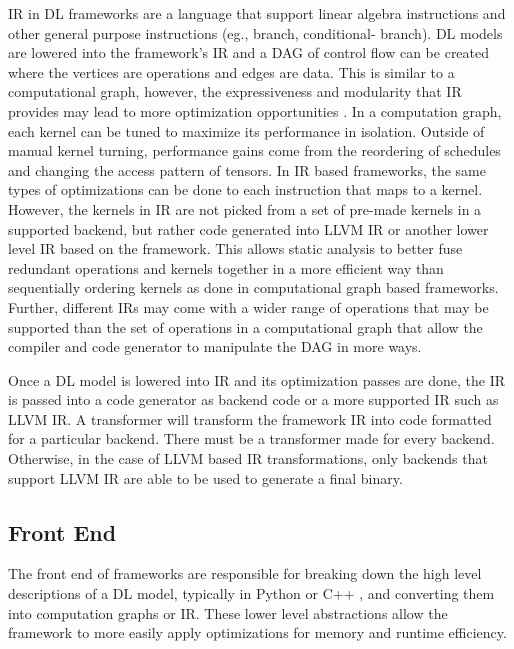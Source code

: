 IR in DL frameworks are a language that support linear algebra instructions and
other general purpose instructions (eg., branch, conditional- branch). DL
models are lowered into the framework's IR and a DAG of control flow
\cite{nGraph} can be created where the vertices are operations and edges are
data. This is similar to a computational graph, however, the expressiveness and
modularity that IR provides may lead to more optimization opportunities
\cite{DLVM}. In a computation graph, each kernel can be tuned to maximize its
performance in isolation. Outside of manual kernel turning, performance gains
come from the reordering of schedules and changing the access pattern of
tensors.  In IR based frameworks, the same types of optimizations can be done
to each instruction that maps to a kernel. However, the kernels in IR are not
picked from a set of pre-made kernels in a supported backend, but rather code
generated into LLVM IR or another lower level IR based on the framework. This
allows static analysis to better fuse redundant operations and kernels together
in a more efficient way than sequentially ordering kernels as done in
computational graph based frameworks. Further, different IRs may come with
a wider range of operations that may be supported than the set of operations in
a computational graph that allow the compiler and code generator to manipulate
the DAG in more ways.

Once a DL model is lowered into IR and its optimization passes are done, the IR
is passed into a code generator as backend code or a more supported IR such as
LLVM IR. A transformer will transform the framework IR into code formatted for
a particular backend. There must be a transformer made for every backend. Otherwise,
in the case of LLVM based IR transformations, only backends that support LLVM
IR are able to be used to generate a final binary.


\subsection{Front End}
The front end of frameworks are responsible for breaking down the high level
descriptions of a DL model, typically in Python or C++ \cite{tensorflow}, and
converting them into computation graphs or IR. These lower level abstractions
allow the framework to more easily apply optimizations for memory and runtime
efficiency.

